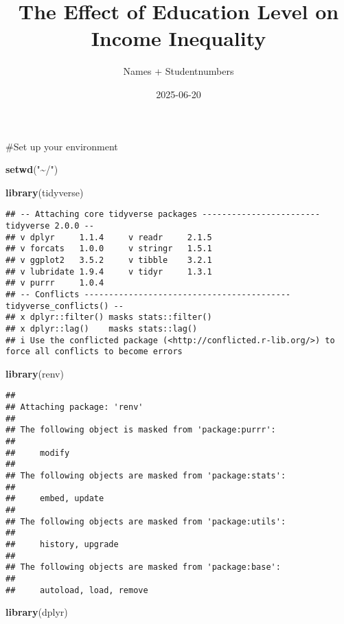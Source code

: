 \documentclass[
]{article}
\title{The Effect of Education Level on Income Inequality}
\author{Names + Studentnumbers}
\date{2025-06-20}
\newenvironment{Shaded}{\begin{snugshade}}{\end{snugshade}}
\newcommand{\FunctionTok}[1]{\textcolor[rgb]{0.13,0.29,0.53}{\textbf{#1}}}
\newcommand{\NormalTok}[1]{#1}
\newcommand{\StringTok}[1]{\textcolor[rgb]{0.31,0.60,0.02}{#1}}
\begin{document}
\maketitle

\#Set up your environment

\begin{Shaded}
\begin{Highlighting}[]
\FunctionTok{setwd}\NormalTok{(}\StringTok{"\textasciitilde{}/"}\NormalTok{)}
\end{Highlighting}
\end{Shaded}

\begin{Shaded}
\begin{Highlighting}[]
\FunctionTok{library}\NormalTok{(tidyverse)}
\end{Highlighting}
\end{Shaded}

\begin{verbatim}
## -- Attaching core tidyverse packages ------------------------ tidyverse 2.0.0 --
## v dplyr     1.1.4     v readr     2.1.5
## v forcats   1.0.0     v stringr   1.5.1
## v ggplot2   3.5.2     v tibble    3.2.1
## v lubridate 1.9.4     v tidyr     1.3.1
## v purrr     1.0.4     
## -- Conflicts ------------------------------------------ tidyverse_conflicts() --
## x dplyr::filter() masks stats::filter()
## x dplyr::lag()    masks stats::lag()
## i Use the conflicted package (<http://conflicted.r-lib.org/>) to force all conflicts to become errors
\end{verbatim}

\begin{Shaded}
\begin{Highlighting}[]
\FunctionTok{library}\NormalTok{(renv)}
\end{Highlighting}
\end{Shaded}

\begin{verbatim}
## 
## Attaching package: 'renv'
## 
## The following object is masked from 'package:purrr':
## 
##     modify
## 
## The following objects are masked from 'package:stats':
## 
##     embed, update
## 
## The following objects are masked from 'package:utils':
## 
##     history, upgrade
## 
## The following objects are masked from 'package:base':
## 
##     autoload, load, remove
\end{verbatim}

\begin{Shaded}
\begin{Highlighting}[]
\FunctionTok{library}\NormalTok{(dplyr)}
\end{Highlighting}
\end{Shaded}
\end{document}
